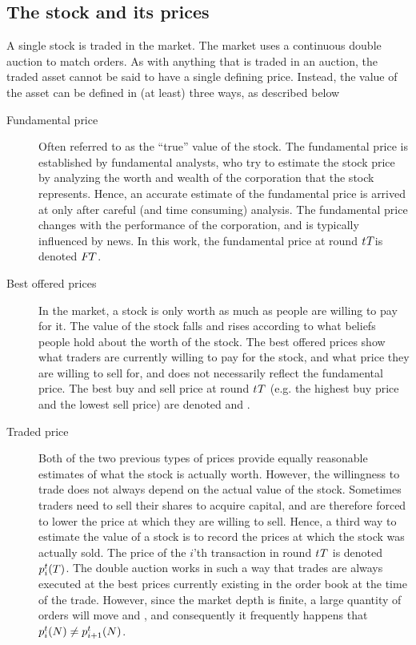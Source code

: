\subsection{The stock and its prices}
A single stock is traded in the market. The market uses a continuous double auction to match orders. As with anything that is traded in an auction, the traded asset cannot be said to have a single defining price. Instead, the value of the asset can be defined in (at least) three ways, as described below

\begin{description}
\item[Fundamental price] Often referred to as the ``true'' value of the stock. The fundamental price is established by fundamental analysts, who try to estimate the stock price by analyzing the worth and wealth of the corporation that the stock represents. Hence, an accurate estimate of the fundamental price is arrived at only after careful (and time consuming) analysis. The fundamental price changes with the performance of the corporation, and is typically influenced by news. In this work, the fundamental price at round $\round{T}$is denoted $\fundamentalprice{T}$.
\item[Best offered prices] In the market, a stock is only worth as much as people are willing to pay for it. The value of the stock falls and rises according to what beliefs people hold about the worth of the stock. The best offered prices show what traders are currently willing to pay for the stock, and what price they are willing to sell for, and does not necessarily reflect the fundamental price. The best buy and sell price at round $\round{T}$ (e.g. the highest buy price and the lowest sell price) are denoted  and .
\item[Traded price] Both of the two previous types of prices provide equally reasonable estimates of what the stock is actually worth. However, the willingness to trade does not always depend on the actual value of the stock. Sometimes traders need to sell their shares to acquire capital, and are therefore forced to lower the price at which they are willing to sell. Hence, a third way to estimate the value of a stock is to record the prices at which the stock was actually sold. The price of the $i$'th transaction in round $\round{T}$ is denoted $\tradeprice{T}{i}$. The double auction works in such a way that trades are always executed at the best prices currently existing in the order book at the time of the trade. However, since the market depth is finite, a large quantity of orders will move  and , and consequently it frequently happens that $\tradeprice{N}{i} \neq \tradeprice{N}{i+1}$.
\end{description}

